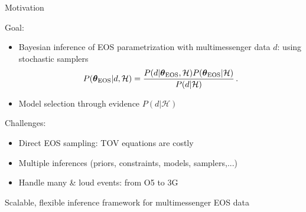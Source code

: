\documentclass[usenames,dvipsnames,t]{beamer}
\newcommand{\thetaeos}{\boldsymbol{\theta}_{\rm{EOS}}}
\begin{document}
\begin{frame}{Motivation}
  \def\x{4mm}
  \def\y{1mm}

  Goal:
  \begin{itemize}
    \item Bayesian inference of EOS parametrization with multimessenger data $d$: using stochastic samplers
    \begin{equation*}
      P(\thetaeos | d, \mathcal{H}) = \frac{P(d | \thetaeos, \mathcal{H}) P(\thetaeos | \mathcal{H})}{P(d | \mathcal{H})} \, .
    \end{equation*}

    \vspace{\y}

    \item Model selection through evidence $P(d | \mathcal{H})$

  \end{itemize}

  \pause
  \vspace{\x}

  Challenges:
  \begin{itemize}
    \item Direct EOS sampling: TOV equations are costly

    \vspace{\y}

    \item Multiple inferences (priors, constraints, models, samplers,...) 

    \vspace{\y}

    \item Handle many \& loud events: from O5 to 3G
  \end{itemize}

  \pause

  \begin{tcolorbox}[colback=blue!5!white,colframe=blue!75!black,title=Need]
      Scalable, flexible inference framework for multimessenger EOS data
  \end{tcolorbox}

\end{frame}
\end{document}
